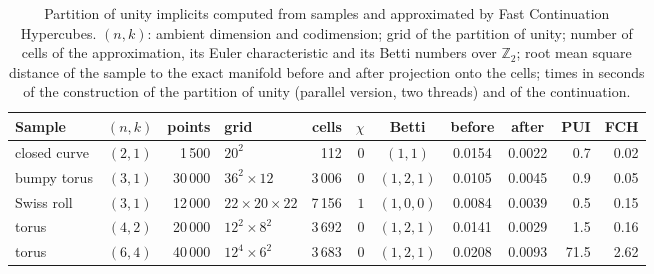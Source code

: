\begin{table}[t]
\caption{Partition of unity implicits computed from samples and approximated by Fast Continuation Hypercubes.
$(n,k)$: ambient dimension and codimension; grid of the partition of unity; number of cells of the
approximation, its Euler characteristic and its Betti numbers over $\mathbb{Z}_2$; root mean square distance of
the sample to the exact manifold before and after projection onto the cells; times in seconds of the
construction of the partition of unity (parallel version, two threads) and of the continuation.}
\label{tab:ml:runs}
\centering
\small
\setlength{\tabcolsep}{3pt}
\begin{tabular}{@{}lcrlrrcccrr@{}}
\toprule
Sample & $(n,k)$ & points & grid & cells & $\chi$ & Betti & before & after & PUI & FCH\\
\midrule
closed curve & $(2,1)$ & 1\,500 & $20^{2}$ & 112 & $0$ & $(1, 1)$ & 0.0154 & 0.0022 & 0.7 & 0.02\\
bumpy torus & $(3,1)$ & 30\,000 & $36^{2}\times12$ & 3\,006 & $0$ & $(1, 2, 1)$ & 0.0105 & 0.0045 & 0.9 & 0.05\\
Swiss roll & $(3,1)$ & 12\,000 & $22\times20\times22$ & 7\,156 & $1$ & $(1, 0, 0)$ & 0.0084 & 0.0039 & 0.5 & 0.15\\
torus & $(4,2)$ & 20\,000 & $12^{2}\times8^{2}$ & 3\,692 & $0$ & $(1, 2, 1)$ & 0.0141 & 0.0029 & 1.5 & 0.16\\
torus & $(6,4)$ & 40\,000 & $12^{4}\times6^{2}$ & 3\,683 & $0$ & $(1, 2, 1)$ & 0.0208 & 0.0093 & 71.5 & 2.62\\
\bottomrule
\end{tabular}
\end{table}
